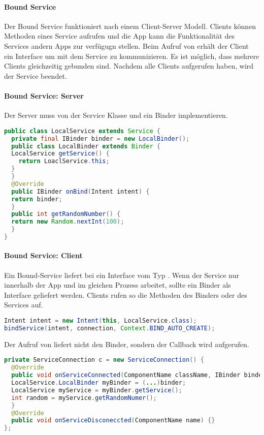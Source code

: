 \paragraph{Bound Service} Der Bound Service funktioniert nach einem Client-Server Modell. Clients können Methoden eines Service aufrufen und die App kann die Funktionalität des Services andern Apps zur verfügugn stellen. Beim Aufruf von  erhält der Client ein Interface um mit dem Service zu kommunizieren. Es ist möglich, dass mehrere Clients gleichzeitig gebunden sind. Nachdem alle Clients  aufgerufen haben, wird der Service beendet.
\paragraph{Bound Service: Server} Der Server muss von der Service Klasse und ein Binder implementieren.
\begin{lstlisting}[language=java]
public class LocalService extends Service {
  private final IBinder binder = new LocalBinder();
  public class LocalBinder extends Binder {
  LocalService getService() {
    return LoaclService.this;
  }
  }
  @Override
  public IBinder onBind(Intent intent) {
  return binder;
  }
  public int getRandomNumber() {
  return new Random.nextInt(100);
  }
}
\end{lstlisting}
\paragraph{Bound Service: Client} Ein Bound-Service liefert bei  ein Interface vom Typ . Wenn der Service nur innerhalb der App und im gleichen Prozess arbeitet, sollte ein Binder als Interface geliefert werden. Clients rufen so die Methoden des Binders oder des Services auf.
\begin{lstlisting}[language=java]
Intent intent = new Intent(this, LocalService.class);
bindService(intent, connection, Context.BIND_AUTO_CREATE);
\end{lstlisting}
Der Aufruf von  liefert nicht den  Binder, sondern der Callback  wird aufgerufen.
\begin{lstlisting}[language=java]
private ServiceConnection c = new ServiceConnection() {
  @Override
  public void onServiceConnected(ComponentName className, IBinder binder) {
  LocalService.LocalBinder myBinder = (...)binder;
  LocalService myService = myBinder.getService();
  int random = myService.getRandomNumer();
  }
  @Override
  public void onServiceDisconeccted(ComponentName name) {}
};
\end{lstlisting}

